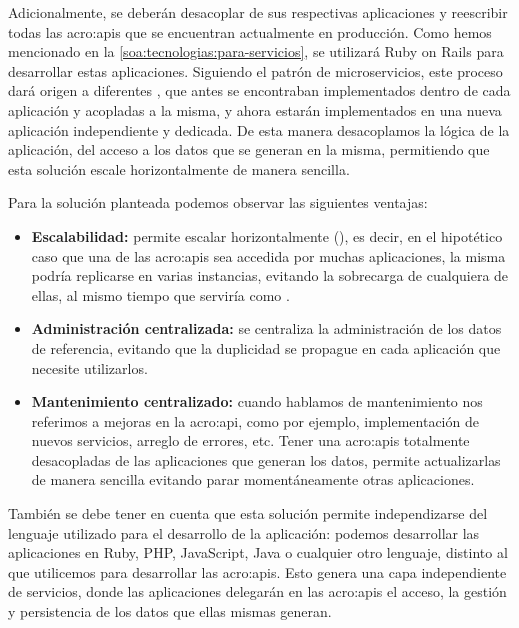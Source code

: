 Adicionalmente, se deberán desacoplar de sus respectivas aplicaciones y reescribir todas las \glspl{acro:api} que se encuentran actualmente en producción. Como hemos mencionado en la \autoref{soa:tecnologias:para-servicios}, se utilizará Ruby on Rails para desarrollar estas aplicaciones. Siguiendo el patrón de microservicios, este proceso dará origen a diferentes , que antes se encontraban implementados dentro de cada aplicación y acopladas a la misma, y ahora estarán implementados en una nueva aplicación independiente y dedicada.  De esta manera desacoplamos la lógica de la aplicación, del acceso a los datos que se generan en la misma, permitiendo que esta solución escale horizontalmente de manera sencilla.

Para la solución planteada podemos observar las siguientes ventajas:

\begin{itemize}
  \item \textbf{Escalabilidad:} permite escalar horizontalmente (), es decir, en el hipotético caso que una de las \glspl{acro:api} sea accedida por muchas aplicaciones, la misma podría replicarse en varias instancias, evitando la sobrecarga de cualquiera de ellas, al mismo tiempo que serviría como .

  \item \textbf{Administración centralizada:} se centraliza la administración de los datos de referencia, evitando que la duplicidad se propague en cada aplicación que necesite utilizarlos.

  \item \textbf{Mantenimiento centralizado:} cuando hablamos de mantenimiento nos referimos a mejoras en la \gls{acro:api}, como por ejemplo, implementación de nuevos servicios, arreglo de errores, etc. Tener una \glspl{acro:api} totalmente desacopladas de las aplicaciones que generan los datos, permite actualizarlas de manera sencilla evitando parar momentáneamente otras aplicaciones.
\end{itemize}

También se debe tener en cuenta que esta solución permite independizarse del lenguaje utilizado para el desarrollo de la aplicación: podemos desarrollar las aplicaciones en Ruby, PHP, JavaScript, Java o cualquier otro lenguaje, distinto al que utilicemos para desarrollar las \glspl{acro:api}. Esto genera una capa independiente de servicios, donde las aplicaciones delegarán en las \glspl{acro:api} el acceso, la gestión y persistencia de los datos que ellas mismas generan.

